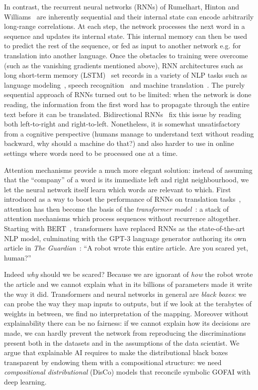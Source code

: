 In contrast, the recurrent neural networks (RNNs) of Rumelhart, Hinton and Williams~\cite{RumelhartEtAl86} are inherently sequential and their internal state can encode arbitrarily long-range correlations.
At each step, the network processes the next word in a sequence and updates its internal state.
This internal memory can then be used to predict the rest of the sequence, or fed as input to another network e.g. for translation into another language.
Once the obstacles to training were overcome (such as the vanishing gradients mentioned above), RNN architectures such as long short-term memory (LSTM)~\cite{HochreiterSchmidhuber97} set records in a variety of NLP tasks such as language modeling~\cite{SutskeverEtAl11}, speech recognition~\cite{GravesEtAl13} and machine translation~\cite{SutskeverEtAl14}.
The purely sequential approach of RNNs turned out to be limited: when the network is done reading, the information from the first word has to propagate through the entire text before it can be translated.
Bidirectional RNNs~\cite{SchusterPaliwal97} fix this issue by reading both left-to-right and right-to-left.
Nonetheless, it is somewhat unsatisfactory from a cognitive perspective (humans manage to understand text without reading backward, why should a machine do that?) and also harder to use in online settings where words need to be processed one at a time.

Attention mechanisms provide a much more elegant solution: instead of assuming that the ``company'' of a word is its immediate left and right neighbourhood, we let the neural network itself learn which words are relevant to which.
First introduced as a way to boost the performance of RNNs on translation tasks~\cite{BahdanauEtAl15}, attention has then become the basis of the \emph{transformer model}~\cite{VaswaniEtAl17}: a stack of attention mechanisms which process sequences without recurrence altogether.
Starting with BERT~\cite{DevlinEtAl19}, transformers have replaced RNNs as the state-of-the-art NLP model, culminating with the GPT-3 language generator authoring its own article in \emph{The Guardian}~\cite{GPT-320}:
``A robot wrote this entire article. Are you scared yet, human?''

Indeed \emph{why} should we be scared?
Because we are ignorant of \emph{how} the robot wrote the article and we cannot explain what in its billions of parameters made it write the way it did.
Transformers and neural networks in general are \emph{black boxes}: we can probe the way they map inputs to outputs, but if we look at the terabytes of weights in between, we find no interpretation of the mapping.
Moreover without explainability there can be no fairness: if we cannot explain how its decisions are made, we can hardly prevent the network from reproducing the discriminations present both in the datasets and in the assumptions of the data scientist.
We argue that explainable AI requires to make the distributional black boxes transparent by endowing them with a compositional structure: we need \emph{compositional distributional} (DisCo) models that reconcile symbolic GOFAI with deep learning.

